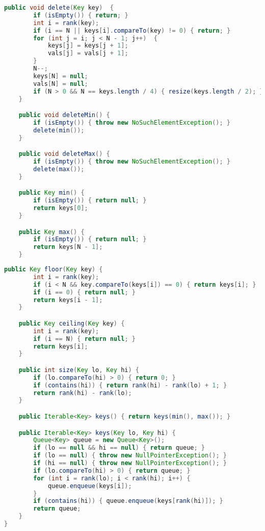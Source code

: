 \documentclass[8pt,a4paper,compress]{beamer}
\begin{document}
\begin{frame}[fragile]
\pause

\begin{lstlisting}[language=Java]
    public void delete(Key key)  {
        if (isEmpty()) { return; }
        int i = rank(key);
        if (i == N || keys[i].compareTo(key) != 0) { return; }
        for (int j = i; j < N - 1; j++)  {
            keys[j] = keys[j + 1];
            vals[j] = vals[j + 1];
        }
        N--;
        keys[N] = null; 
        vals[N] = null;
        if (N > 0 && N == keys.length / 4) { resize(keys.length / 2); }
    } 

    public void deleteMin() {
        if (isEmpty()) { throw new NoSuchElementException(); }
        delete(min());
    }

    public void deleteMax() {
        if (isEmpty()) { throw new NoSuchElementException(); }
        delete(max());
    }

    public Key min() {
        if (isEmpty()) { return null; }
        return keys[0]; 
    }

    public Key max() {
        if (isEmpty()) { return null; }
        return keys[N - 1];
    }
\end{lstlisting}
\end{frame}

\begin{frame}[fragile]
\pause

\begin{lstlisting}[language=Java]
    public Key floor(Key key) {
        int i = rank(key);
        if (i < N && key.compareTo(keys[i]) == 0) { return keys[i]; }
        if (i == 0) { return null; }
        return keys[i - 1];
    }

    public Key ceiling(Key key) {
        int i = rank(key);
        if (i == N) { return null; }
        return keys[i];
    }

    public int size(Key lo, Key hi) {
        if (lo.compareTo(hi) > 0) { return 0; }
        if (contains(hi)) { return rank(hi) - rank(lo) + 1; }
        return rank(hi) - rank(lo);
    }

    public Iterable<Key> keys() { return keys(min(), max()); }

    public Iterable<Key> keys(Key lo, Key hi) {
        Queue<Key> queue = new Queue<Key>(); 
        if (lo == null && hi == null) { return queue; }
        if (lo == null) { throw new NullPointerException(); }
        if (hi == null) { throw new NullPointerException(); }
        if (lo.compareTo(hi) > 0) { return queue; }
        for (int i = rank(lo); i < rank(hi); i++) {
            queue.enqueue(keys[i]);
        }
        if (contains(hi)) { queue.enqueue(keys[rank(hi)]); }
        return queue; 
    }    
}
\end{lstlisting}
\end{frame}
\end{document}
